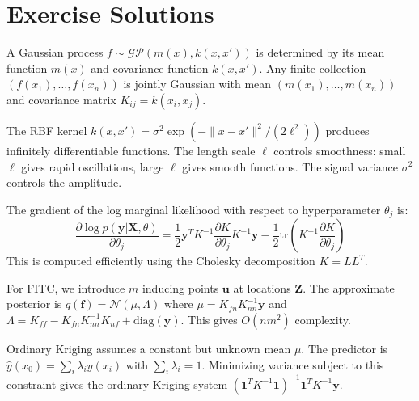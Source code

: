 \section{Exercise Solutions}

\begin{solution}
A Gaussian process $f \sim \mathcal{GP}(m(x), k(x,x'))$ is determined by its mean function $m(x)$ and covariance function $k(x,x')$. Any finite collection $(f(x_1), \ldots, f(x_n))$ is jointly Gaussian with mean $(m(x_1), \ldots, m(x_n))$ and covariance matrix $K_{ij} = k(x_i, x_j)$.
\end{solution}

\begin{solution}
The RBF kernel $k(x,x') = \sigma^2 \exp(-\|x-x'\|^2/(2\ell^2))$ produces infinitely differentiable functions. The length scale $\ell$ controls smoothness: small $\ell$ gives rapid oscillations, large $\ell$ gives smooth functions. The signal variance $\sigma^2$ controls the amplitude.
\end{solution}

\begin{solution}
The gradient of the log marginal likelihood with respect to hyperparameter $\theta_j$ is:
\[
\frac{\partial \log p(\mathbf{y}|\mathbf{X}, \theta)}{\partial \theta_j} = \frac{1}{2} \mathbf{y}^T K^{-1} \frac{\partial K}{\partial \theta_j} K^{-1} \mathbf{y} - \frac{1}{2} \text{tr}\left(K^{-1} \frac{\partial K}{\partial \theta_j}\right)
\]
This is computed efficiently using the Cholesky decomposition $K = LL^T$.
\end{solution}

\begin{solution}
For FITC, we introduce $m$ inducing points $\mathbf{u}$ at locations $\mathbf{Z}$. The approximate posterior is $q(\mathbf{f}) = \mathcal{N}(\mu, \Lambda)$ where $\mu = K_{fn}K_{nn}^{-1}\mathbf{y}$ and $\Lambda = K_{ff} - K_{fn}K_{nn}^{-1}K_{nf} + \text{diag}(\mathbf{y})$. This gives $O(nm^2)$ complexity.
\end{solution}

\begin{solution}
Ordinary Kriging assumes a constant but unknown mean $\mu$. The predictor is $\hat{y}(x_0) = \sum_i \lambda_i y(x_i)$ with $\sum_i \lambda_i = 1$. Minimizing variance subject to this constraint gives the ordinary Kriging system $(\mathbf{1}^T K^{-1} \mathbf{1})^{-1} \mathbf{1}^T K^{-1} \mathbf{y}$.
\end{solution}

